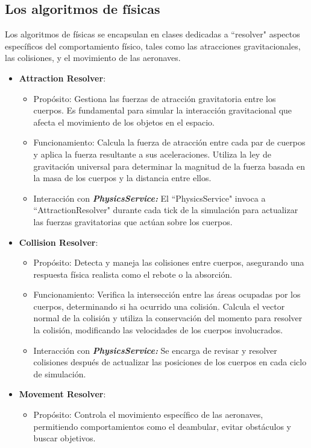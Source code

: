 \subsection{Los algoritmos de físicas}
Los algoritmos de físicas se encapsulan en clases dedicadas a ``resolver" aspectos específicos del comportamiento físico, tales como las atracciones gravitacionales, las colisiones, y el movimiento de las aeronaves.
\begin{itemize}
    \item \textbf{Attraction Resolver}:
    \begin{itemize}
        \item Propósito: Gestiona las fuerzas de atracción gravitatoria entre los cuerpos. Es fundamental para simular la interacción gravitacional que afecta el movimiento de los objetos en el espacio.
        \item Funcionamiento: Calcula la fuerza de atracción entre cada par de cuerpos y aplica la fuerza resultante a sus aceleraciones. Utiliza la ley de gravitación universal para determinar la magnitud de la fuerza basada en la masa de los cuerpos y la distancia entre ellos.
        \item Interacción con \textbf{\textit{PhysicsService:}} El ``PhysicsService" invoca a ``AttractionResolver" durante cada tick de la simulación para actualizar las fuerzas gravitatorias que actúan sobre los cuerpos.
    \end{itemize}
    \item \textbf{Collision Resolver}:
    \begin{itemize}
        \item Propósito: Detecta y maneja las colisiones entre cuerpos, asegurando una respuesta física realista como el rebote o la absorción.
        \item Funcionamiento: Verifica la intersección entre las áreas ocupadas por los cuerpos, determinando si ha ocurrido una colisión. Calcula el vector normal de la colisión y utiliza la conservación del momento para resolver la colisión, modificando las velocidades de los cuerpos involucrados.
        \item Interacción con \textbf{\textit{PhysicsService:}} Se encarga de revisar y resolver colisiones después de actualizar las posiciones de los cuerpos en cada ciclo de simulación.
    \end{itemize}
    \item \textbf{Movement Resolver}: 
    \begin{itemize}
        \item Propósito: Controla el movimiento específico de las aeronaves, permitiendo comportamientos como el deambular, evitar obstáculos y buscar objetivos.

\end{itemize}
\end{itemize}
